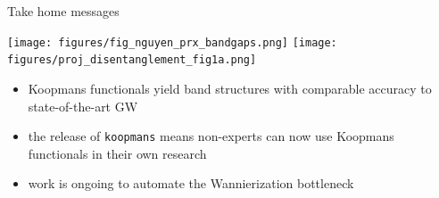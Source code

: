 \documentclass[xcolor=table,aspectratio=169]{beamer}
\numberwithin{equation}{section}
\begin{document}
\begin{frame}{Take home messages}

   \texttt{[image: figures/fig\_nguyen\_prx\_bandgaps.png]}
   \hfill
   \texttt{[image: figures/proj\_disentanglement\_fig1a.png]}
   \hfill

   \begin{itemize}
      \item Koopmans functionals yield band structures with comparable accuracy to state-of-the-art GW
      \item the release of \texttt{koopmans} means non-experts can now use Koopmans functionals in their own research
      \item work is ongoing to automate the Wannierization bottleneck
   \end{itemize}

\end{frame}
\end{document}
